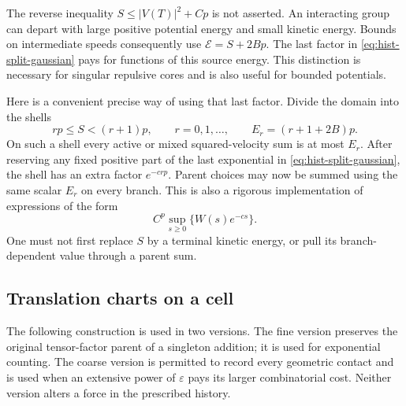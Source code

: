 \begin{remark}
\label{hist:positive-potential}
The reverse inequality $S\leq |V(T)|^2+Cp$ is not asserted.  An
interacting group can depart with large positive potential energy and
small kinetic energy.  Bounds on intermediate speeds consequently
use $\mathcal E=S+2Bp$.  The last factor in
\eqref{eq:hist-split-gaussian} pays for functions of this source energy.
This distinction is necessary for singular repulsive cores and is
also useful for bounded potentials.
\end{remark}

Here is a convenient precise way of using that last factor.  Divide
the domain into the shells
\begin{equation}
 rp\leq S<(r+1)p,\qquad r=0,1,\ldots,\qquad
 E_r=(r+1+2B)p.
 \label{eq:hist-shells}
\end{equation}
On such a shell every active or mixed squared-velocity sum is at most
$E_r$.  After reserving any fixed positive part of the last exponential
in \eqref{eq:hist-split-gaussian}, the shell has an extra factor
$e^{-c rp}$.  Parent choices may now be summed using the same scalar
$E_r$ on every branch.  This is also a rigorous implementation of
expressions of the form
\begin{equation}
 C^p\sup_{s\geq0}\{W(s)e^{-cs}\}.
 \label{eq:hist-energy-payment}
\end{equation}
One must not first replace $S$ by a terminal kinetic energy, or pull its
branch-dependent value through a parent sum.

\subsection{Translation charts on a cell}

The following construction is used in two versions.  The fine version
preserves the original tensor-factor parent of a singleton addition;
it is used for exponential counting.  The coarse version is permitted
to record every geometric contact and is used when an extensive power
of $\varepsilon$ pays its larger combinatorial cost.  Neither version
alters a force in the prescribed history.

